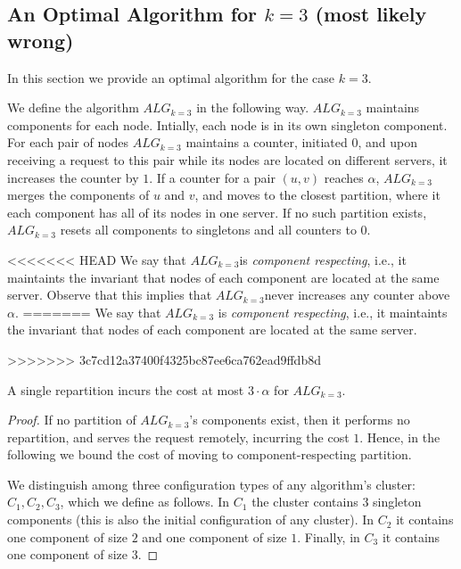 \documentclass[manuscript,screen=true]{acmart}
\newcommand{\TAlg}{{\ensuremath{ALG_{k=3}}}} %
\newcommand\maciek[1]{\color{brown}\textbf{\\ Maciek: #1}\color{black}}
\begin{document}
\begin{appendix}
  \section{An Optimal Algorithm for $k=3$ (most likely wrong)}

  In this section we provide an optimal algorithm for the case $k=3$.
  
  We define the algorithm \TAlg{} in the following way.
  \TAlg{} maintains components for each node.
  Intially, each node is in its own singleton component.
  For each pair of nodes \TAlg{} maintains a counter, initiated $0$, and upon receiving a request to this pair while its nodes are located on different servers, it increases the counter by $1$.
  If a counter for a pair $(u,v)$ reaches $\alpha$, \TAlg{} merges the components of $u$ and $v$, and moves to the closest partition, where it each component has all of its nodes in one server.
  If no such partition exists, \TAlg{} resets all components to singletons and all counters to $0$.


<<<<<<< HEAD
  We say that \TAlg is \emph{component respecting}, i.e., it maintaints the invariant that nodes of each component are located at the same server.
  Observe that this implies that \TAlg never increases any counter above $\alpha$.
=======
  We say that \TAlg{} is \emph{component respecting}, i.e., it maintaints the invariant that nodes of each component are located at the same server.

>>>>>>> 3c7cd12a37400f4325bc87ee6ca762ead9ffdb8d
  
  \begin{lemma}
    \label{lem:1req}
    A single repartition incurs the cost at most $3\cdot\alpha$ for \TAlg.
  \end{lemma}
  
  \begin{proof}
    If no partition of \TAlg's components exist, then it performs no repartition, and serves the request remotely, incurring the cost $1$.
    Hence, in the following we bound the cost of moving to component-respecting partition.
  
    We distinguish among three configuration types of any algorithm's cluster: $C_1, C_2, C_3$, which we define as follows. In $C_1$ the cluster contains $3$ singleton components (this is also the initial configuration of any cluster). In $C_2$ it contains one component of size $2$ and one component of size $1$. Finally, in $C_3$ it contains one component of size $3$.
    

\end{proof}
\end{appendix}
\end{document}
